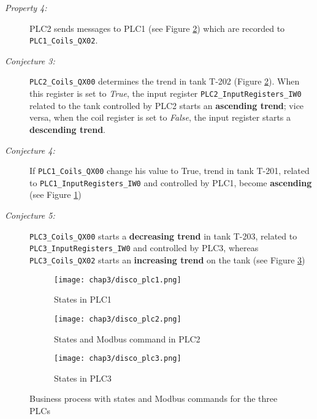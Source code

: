 \begin{description}
	\item[\colorbox{backcolourtext}{\textnormal{\textit{Property 4:}}}] PLC2 sends messages to PLC1 (see Figure \ref{subfig:pm_plc2}) which are recorded to \texttt{PLC1\_Coils\_QX02}.
	
	\item[\colorbox{backcolourtext}{\textnormal{\textit{Conjecture 3:}}}] \texttt{PLC2\_Coils\_QX00} determines the trend in tank T-202 (Figure \ref{subfig:pm_plc2}). \newline
	When this register is set to \textit{True}, the input register \texttt{PLC2\_InputRegisters\_IW0} related to the tank controlled by PLC2 starts an \textbf{ascending trend}; vice versa, when the coil register is set to \textit{False}, the input register starts a \textbf{descending trend}.
	
	\item[\colorbox{backcolourtext}{\textnormal{\textit{Conjecture 4:}}}] If \texttt{PLC1\_Coils\_QX00} change his value to True, trend in tank T-201, related to \texttt{PLC1\_InputRegisters\_IW0} and controlled by PLC1, become \textbf{ascending} (see Figure \ref{subfig:pm_plc1})

	\item[\colorbox{backcolourtext}{\textnormal{\textit{Conjecture 5:}}}] \texttt{PLC3\_Coils\_QX00} starts a \textbf{decreasing trend} in tank T-203, related to \texttt{PLC3\_InputRegisters\_IW0} and controlled by PLC3, whereas \texttt{PLC3\_Coils\_QX02} starts an \textbf{increasing trend} on the tank (see Figure \ref{subfig:pm_plc3})
\end{description}
\vfill
\pagebreak

\begin{figure}[H]
	\centering
	\begin{subfigure}{0.7\textwidth}
		\texttt{[image: chap3/disco\_plc1.png]}
		\caption{States in PLC1}
		\label{subfig:pm_plc1}
	\end{subfigure}
	\hfill
	\begin{subfigure}{0.48\textwidth}
		\texttt{[image: chap3/disco\_plc2.png]}
		\caption{States and Modbus command in PLC2}
		\label{subfig:pm_plc2}
	\end{subfigure}
	\hfill
	\begin{subfigure}{0.48\textwidth}
		\texttt{[image: chap3/disco\_plc3.png]}
		\caption{States in PLC3}
		\label{subfig:pm_plc3}
	\end{subfigure}
	\caption{Business process with states and Modbus commands for the three PLCs}
	\label{fig:business_process_cecccato}
\end{figure}
\pagebreak

